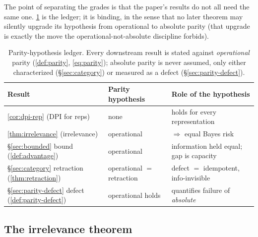 \begin{remark}
\label{rem:parity-ledger}
The point of separating the grades is that the paper's results do not all
need the same one. \cref{tab:parity-ledger} is the ledger; it is binding, in
the sense that no later theorem may silently upgrade its hypothesis from
operational to absolute parity (that upgrade is exactly the move
the operational-not-absolute discipline forbids).

\begin{table}[h]
\centering
\small
\begin{tabular}{@{}lll@{}}
\toprule
Result & Parity hypothesis & Role of the hypothesis \\
\midrule
\cref{cor:dpi-rep} (DPI for reps)            & none           & holds for every representation \\
\cref{thm:irrelevance} (irrelevance)         & operational    & $\Rightarrow$ equal Bayes risk \\
\S\ref{sec:bounded} bound (\cref{def:advantage}) & operational & information held equal; gap is capacity \\
\S\ref{sec:category} retraction (\cref{thm:retraction}) & operational $=$ retraction & defect $=$ idempotent, info-invisible \\
\S\ref{sec:parity-defect} defect (\cref{def:parity-defect}) & operational holds & quantifies failure of \emph{absolute} \\
\bottomrule
\end{tabular}
\caption{Parity-hypothesis ledger. Every downstream result is stated against
\emph{operational} parity (\cref{def:parity}, \eqref{eq:parity}); absolute
parity is never assumed, only either characterized (\S\ref{sec:category}) or
measured as a defect (\S\ref{sec:parity-defect}).}
\label{tab:parity-ledger}
\end{table}
\end{remark}

\subsection{The irrelevance theorem}
\label{subsec:irrelevance}

